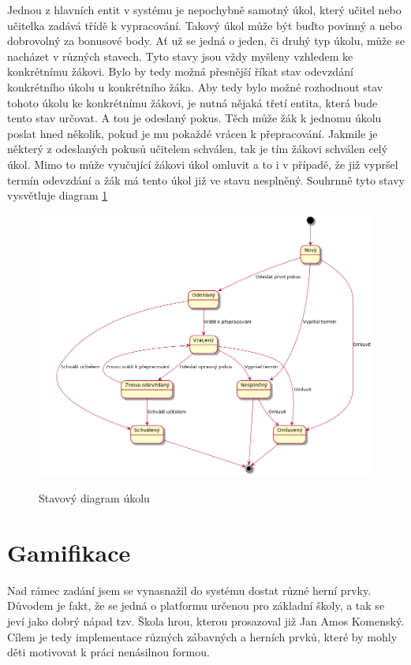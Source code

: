 \documentclass[twoside]{ctuthesis}
\theoremstyle{plain}
\theoremstyle{definition}
\theoremstyle{note}
\begin{document}
Jednou z hlavních entit v systému je nepochybně samotný úkol, který učitel nebo učitelka zadává třídě k vypracování. Takový úkol může být buďto povinný a nebo dobrovolný za bonusové body. Ať už se jedná o jeden, či druhý typ úkolu, může se nacházet v různých stavech. Tyto stavy jsou vždy myšleny vzhledem ke konkrétnímu žákovi. Bylo by tedy možná přesnější říkat stav odevzdání konkrétního úkolu u konkrétního žáka. Aby tedy bylo možné rozhodnout stav tohoto úkolu ke konkrétnímu žákovi, je nutná nějaká třetí entita, která bude tento stav určovat. A tou je odeslaný pokus. Těch může žák k jednomu úkolu poslat hned několik, pokud je mu pokaždé vrácen k přepracování. Jakmile je některý z odeslaných pokusů učitelem schválen, tak je tím žákovi schválen celý úkol. Mimo to může vyučující žákovi úkol omluvit a to i v případě, že již vypršel termín odevzdání a žák má tento úkol již ve stavu nesplněný. Souhrnně tyto stavy vysvětluje diagram \ref{fig:taskStateDiagram}

\begin{figure}
    \caption{Stavový diagram úkolu}
    \centering
    \includegraphics[width=\textwidth]{images/task-state-diagram}
    \label{fig:taskStateDiagram}
\end{figure}







\chapter{Gamifikace}
\label{chap:gamifikace}
Nad rámec zadání jsem se vynasnažil do systému dostat různé herní prvky. Důvodem je fakt, že se jedná o platformu určenou pro základní školy, a tak se jeví jako dobrý nápad tzv. Škola hrou, kterou prosazoval již Jan Amos Komenský. Cílem je tedy implementace různých zábavných a herních prvků, které by mohly děti motivovat k práci nenásilnou formou. 
\end{document}
